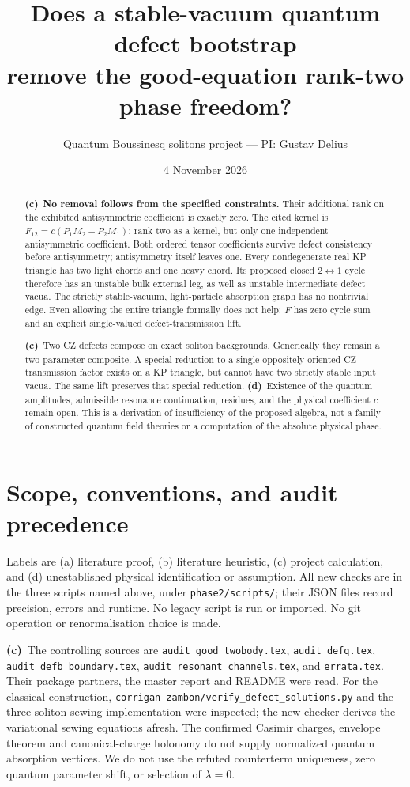 \documentclass[11pt,a4paper]{article}
\title{Does a stable-vacuum quantum defect bootstrap\\remove the good-equation rank-two phase freedom?}
\author{Quantum Boussinesq solitons project --- PI: Gustav Delius}
\date{4 November 2026}
\newcommand{\C}{\textbf{(c)}\ }
\newcommand{\D}{\textbf{(d)}\ }
\newcommand{\file}[1]{\nolinkurl{#1}}
\begin{document}
\maketitle
\begin{abstract}
\C \textbf{No removal follows from the specified constraints.} Their additional
rank on the exhibited antisymmetric coefficient is exactly zero. The cited
kernel is $F_{12}=c(P_1M_2-P_2M_1)$: rank two as a kernel, but only one
independent antisymmetric coefficient. Both ordered tensor coefficients
survive defect consistency before antisymmetry; antisymmetry itself leaves
one. Every nondegenerate real KP triangle has two light chords and one heavy
chord. Its proposed closed $2\leftrightarrow1$ cycle therefore has an unstable
bulk external leg, as well as unstable intermediate defect vacua. The
strictly stable-vacuum, light-particle absorption graph has no nontrivial edge.
Even allowing the entire triangle formally does not help: $F$ has zero
cycle sum and an explicit single-valued defect-transmission lift.

\C Two CZ defects compose on exact soliton backgrounds. Generically they
remain a two-parameter composite. A special reduction to a single oppositely
oriented CZ transmission factor exists on a KP triangle, but cannot have two
strictly stable input vacua. The same lift preserves that special reduction.
\D Existence of the quantum amplitudes, admissible resonance continuation,
residues, and the physical coefficient $c$ remain open. This is a derivation
of insufficiency of the proposed algebra, not a family of constructed quantum
field theories or a computation of the absolute physical phase.
\end{abstract}

\section{Scope, conventions, and audit precedence}
Labels are (a) literature proof, (b) literature heuristic, (c) project
calculation, and (d) unestablished physical identification or assumption.
All new checks are in the three scripts named above, under
\file{phase2/scripts/}; their JSON files record precision, errors and runtime.
No legacy script is run or imported. No git operation or renormalisation
choice is made.

\C The controlling sources are \file{audit_good_twobody.tex},
\file{audit_defq.tex}, \file{audit_defb_boundary.tex},
\file{audit_resonant_channels.tex}, and \file{errata.tex}. Their package
partners, the master report and README were read. For the classical
construction, \file{corrigan-zambon/verify_defect_solutions.py} and the
three-soliton sewing implementation were inspected; the new checker derives
the variational sewing equations afresh. The confirmed Casimir charges,
envelope theorem and canonical-charge holonomy do not supply normalized
quantum absorption vertices. We do not use the refuted counterterm
uniqueness, zero quantum parameter shift, or selection of $\lambda=0$.
\end{document}

